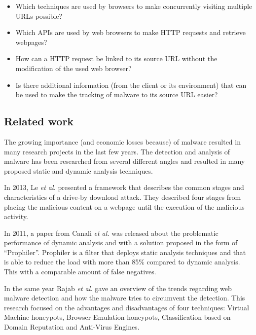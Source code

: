 \begin{itemize}
\item Which techniques are used by browsers to make concurrently visiting multiple URLs possible?
\item Which APIs are used by web browsers to make HTTP requests and retrieve webpages?
\item How can a HTTP request be linked to its source URL without the modification of the used web browser?
\item Is there additional information (from the client or its environment) that can be used to make the tracking of malware to its source URL easier?
\end{itemize}


\subsection{Related work}

The growing importance (and economic losses because) of malware resulted in many research projects in the last few years. The detection and analysis of malware has been researched from several different angles \cite{auto_malware,Chang2013} and resulted in many proposed static and dynamic analysis techniques.

In 2013, Le \textit{et al.} \cite{Le2013} presented a framework that describes the common stages and characteristics of a drive-by download attack. They described four stages from placing the malicious content on a webpage until the execution of the malicious activity.

In 2011, a paper from Canali \textit{et al.} \cite{Canali2011} was released about the problematic performance of dynamic analysis and with a solution proposed in the form of ``Prophiler''. Prophiler is a filter that deploys static analysis techniques and that is able to reduce the load with more than 85\% compared to dynamic analysis. This with a comparable amount of false negatives.

In the same year Rajab \textit{et al.} \cite{Rajab11trendsin} gave an overview of the trends regarding web malware detection and how the malware tries to circumvent the detection. This research focused on the advantages and disadvantages of four techniques: Virtual Machine honeypots, Browser Emulation honeypots, Classification based on Domain Reputation and Anti-Virus Engines.

